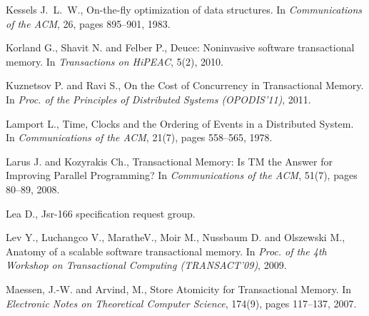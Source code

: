 \begin{thebibliography}{99}
{
Kessels J.~L.~W.,
\newblock On-the-fly optimization of data structures.
\newblock In {\em Communications of the ACM}, 26, pages 895--901, 1983.






Korland G., Shavit N. and Felber P.,
\newblock Deuce: Noninvasive software transactional memory.
\newblock In {\em Transactions on HiPEAC}, 5(2), 2010.



Kuznetsov P. and Ravi S.,
\newblock On the Cost of Concurrency in Transactional Memory.
\newblock In {\em Proc. of the Principles of Distributed Systems (OPODIS'11)}, 2011.




Lamport L., 
Time, Clocks and the Ordering of Events in a Distributed System.
In {\em Communications  of the ACM}, 21(7), pages 558--565, 1978.



Larus J. and Kozyrakis Ch., 
Transactional Memory: Is TM the Answer for Improving Parallel Programming?
In {\it Communications of the ACM}, 51(7), pages 80--89, 2008. 


Lea D.,
\newblock Jsr-166 specification request group.


Lev Y., Luchangco V., MaratheV., Moir M., Nussbaum D. and
  Olszewski M.,
\newblock Anatomy of a scalable software transactional memory.
\newblock In {\em Proc. of the 4th Workshop on Transactional Computing (TRANSACT'09)}, 2009.



 Maessen, J.-W. and Arvind, M.,
 Store Atomicity for Transactional Memory. 
In {\it Electronic  Notes  on Theoretical  Computer Science}, 
174(9), pages 117--137, 2007.



}
\end{thebibliography}
